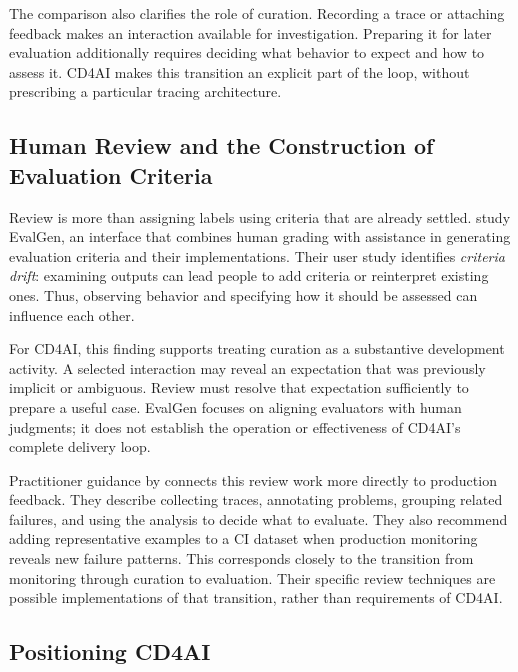 The comparison also clarifies the role of curation. Recording a trace or
attaching feedback makes an interaction available for investigation. Preparing
it for later evaluation additionally requires deciding what behavior to expect
and how to assess it. CD4AI makes this transition an explicit part of the loop,
without prescribing a particular tracing architecture.

\subsection{Human Review and the Construction of Evaluation Criteria}
\label{sec:related-curation}

Review is more than assigning labels using criteria that are already settled.
\textcite{Shankar:Validators:2024} study EvalGen, an interface that combines
human grading with assistance in generating evaluation criteria and their
implementations. Their user study identifies \emph{criteria drift}: examining
outputs can lead people to add criteria or reinterpret existing ones. Thus,
observing behavior and specifying how it should be assessed can influence each
other.

For CD4AI, this finding supports treating curation as a substantive development
activity. A selected interaction may reveal an expectation that was previously
implicit or ambiguous. Review must resolve that expectation sufficiently to
prepare a useful case. EvalGen focuses on aligning evaluators with human
judgments; it does not establish the operation or effectiveness of CD4AI's
complete delivery loop.

Practitioner guidance by \textcite{HusainShankar:EvalsFAQ:2026} connects this
review work more directly to production feedback. They describe collecting
traces, annotating problems, grouping related failures, and using the analysis
to decide what to evaluate. They also recommend adding representative examples
to a CI dataset when production monitoring reveals new failure patterns.
This corresponds closely to the transition from monitoring through curation
to evaluation. Their specific review techniques are possible implementations
of that transition, rather than requirements of CD4AI.

\subsection{Positioning CD4AI}
\label{sec:background-positioning}

